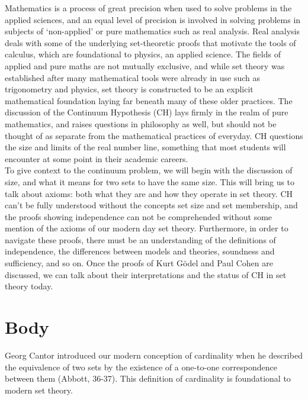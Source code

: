 \documentclass[10pt,letterpaper]{amsart}
\numberwithin{equation}{section}
\theoremstyle{plain}
\theoremstyle{definition}
\numberwithin{equation}{section}
\begin{document}
Mathematics is a process of great precision when used to solve problems in the applied sciences, and an equal level of precision is involved in solving problems in subjects of `non-applied' or pure mathematics such as real analysis. Real analysis deals with some of the underlying set-theoretic proofs that motivate the tools of calculus, which are foundational to physics, an applied science. The fields of applied and pure maths are not mutually exclusive, and while set theory was established after many mathematical tools were already in use such as trigonometry and physics, set theory is constructed to be an explicit mathematical foundation laying far beneath many of these older practices. The discussion of the Continuum Hypothesis (CH) lays firmly in the realm of pure mathematics, and raises questions in philosophy as well, but should not be thought of as separate from the mathematical practices of everyday. CH questions the size and limits of the real number line, something that most students will encounter at some point in their academic careers. \\

To give context to the continuum problem, we will begin with the discussion of size, and what it means for two sets to have the same size. This will bring us to talk about axioms: both what they are and how they operate in set theory. CH can't be fully understood without the concepts set size and set membership, and the proofs showing independence can not be comprehended without some mention of the axioms of our modern day set theory. Furthermore, in order to navigate these proofs, there must be an understanding of the definitions of independence, the differences between models and theories, soundness and sufficiency, and so on. Once the proofs of Kurt Gödel and Paul Cohen are discussed, we can talk about their interpretations and the status of CH in set theory today.



\section{Body}

Georg Cantor introduced our modern conception of cardinality when he described the equivalence of two sets by the existence of a one-to-one correspondence between them (Abbott, 36-37). This definition of cardinality is foundational to modern set theory.\\
\end{document}
